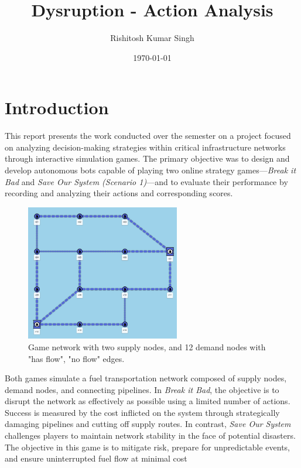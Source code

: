\documentclass[12pt,a4paper]{report}
\title{Dysruption - Action Analysis}
\author{Rishitosh Kumar Singh}
\affil{Arizona State University}
\date{\today}
\begin{document}
\maketitle
\tableofcontents
\clearpage

\chapter{Introduction}
\label{chap:introduction}
    This report presents the work conducted over the semester on a project focused on analyzing decision-making strategies within critical infrastructure networks through interactive simulation games. The primary objective was to design and develop autonomous bots capable of playing two online strategy games—\textit{Break it Bad} and \textit{Save Our System (Scenario 1)}—and to evaluate their performance by recording and analyzing their actions and corresponding scores.

    \begin{figure}[h!]
        \centering
        \includegraphics[width=0.6\textwidth]{images/game-graph.png}
        \caption{Game network with two supply nodes, and 12 demand nodes with "has flow", "no flow" edges.}
        \label{fig:game-graph}
    \end{figure}

    Both games simulate a fuel transportation network composed of supply nodes, demand nodes, and connecting pipelines. In \textit{Break it Bad}, the objective is to disrupt the network as effectively as possible using a limited number of actions. Success is measured by the cost inflicted on the system through strategically damaging pipelines and cutting off supply routes. In contrast, \textit{Save Our System} challenges players to maintain network stability in the face of potential disasters. The objective in this game is to mitigate risk, prepare for unpredictable events, and ensure uninterrupted fuel flow at minimal cost
\end{document}
